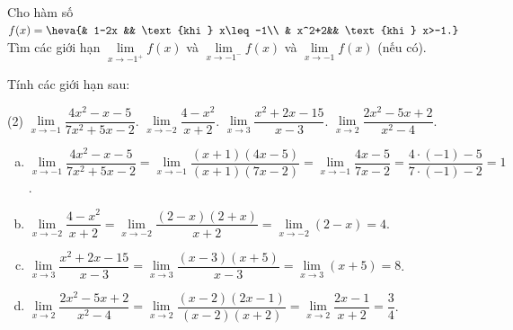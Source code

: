 \begin{bt}
	Cho hàm số $ f(x)=\heva{& 1-2x && \text{khi } x\leq -1\\ & x^2+2&& \text{khi } x>-1.} $\\
	Tìm các giới hạn $ \lim \limits_{x \to {-1}^+} f(x)$ và $ \lim \limits_{x \to {-1}^-} f(x) $ và $ \lim \limits_{x \to -1} f(x) $ (nếu có).
\end{bt}

\begin{bt}
	Tính các giới hạn sau:
	\begin{tasks}(2)
		\task $\lim\limits_{x \to -1}\dfrac{4x^2-x-5}{7x^2+5x-2}$.
		\task $\lim\limits_{x \to -2}\dfrac{4-x^2}{x+2}$.
		\task $\lim\limits_{x \to 3}\dfrac{x^2+2x-15}{x-3}$.
		\task $\lim\limits_{x \to 2}\dfrac{2x^2-5x+2}{x^2-4}$.
	\end{tasks}
	\loigiai
	{
		\begin{enumerate}[a)]
			\item $\lim\limits_{x \to -1}\dfrac{4x^2-x-5}{7x^2+5x-2} = \lim\limits_{x\to -1}\dfrac{(x+1)(4x-5)}{(x+1)(7x-2)} = \lim\limits_{x\to -1}\dfrac{4x-5}{7x-2} = \dfrac{4 \cdot (-1)-5}{7 \cdot (-1)-2} = 1$.
			
			\item $\lim\limits_{x \to -2}\dfrac{4-x^2}{x+2} = \lim\limits_{x \to -2} \dfrac{(2-x)(2+x)}{x+2} = \lim\limits_{x \to -2} (2-x) = 4$.
			
			\item $\lim\limits_{x \to 3}\dfrac{x^2+2x-15}{x-3} = \lim\limits_{x \to 3} \dfrac{(x-3)(x+5)}{x-3} = \lim\limits_{x \to 3} (x + 5) = 8$.
			
			\item $\lim\limits_{x \to 2}\dfrac{2x^2-5x+2}{x^2-4} = \lim\limits_{x \to 2}\dfrac{(x-2)(2x-1)}{(x-2)(x+2)} = \lim\limits_{x \to 2}\dfrac{2x-1}{x+2} = \dfrac{3}{4}$.
			
		\end{enumerate}
	}
\end{bt}

